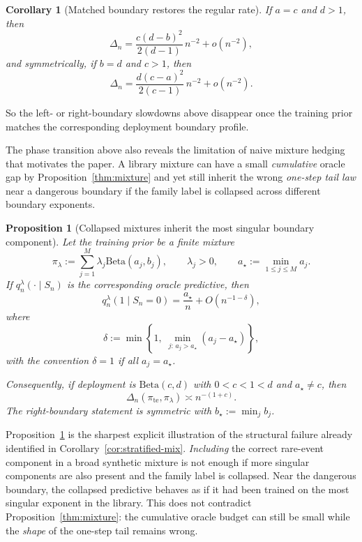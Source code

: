 \documentclass{article}
\newtheorem{proposition}[theorem]{Proposition}
\newtheorem{corollary}[theorem]{Corollary}
\theoremstyle{definition}
\theoremstyle{remark}
\newcommand{\BetaDist}{\mathrm{Beta}}
\newcommand{\te}{\mathrm{te}}
\begin{document}
\begin{corollary}[Matched boundary restores the regular rate]
\label{cor:beta-matched}
If $a=c$ and $d>1$, then
\[
\Delta_n
=
\frac{c(d-b)^2}{2(d-1)}\,n^{-2}
+ o(n^{-2}),
\]
and symmetrically, if $b=d$ and $c>1$, then
\[
\Delta_n
=
\frac{d(c-a)^2}{2(c-1)}\,n^{-2}
+ o(n^{-2}).
\]
\end{corollary}

So the left- or right-boundary slowdowns above disappear once the training prior matches the corresponding deployment boundary profile.

The phase transition above also reveals the limitation of naive mixture hedging that motivates the paper. A library mixture can have a small \emph{cumulative} oracle gap by Proposition~\ref{thm:mixture} and yet still inherit the wrong \emph{one-step tail law} near a dangerous boundary if the family label is collapsed across different boundary exponents.

\begin{proposition}[Collapsed mixtures inherit the most singular boundary component]
\label{thm:beta-mix}
Let the training prior be a finite mixture
\[
\pi_\lambda
:=
\sum_{j=1}^M \lambda_j \BetaDist(a_j,b_j),
\qquad
\lambda_j>0,
\qquad
a_\star:=\min_{1\le j\le M} a_j.
\]
If $q_n^\lambda(\cdot\mid S_n)$ is the corresponding oracle predictive, then
\[
q_n^\lambda(1\mid S_n=0)
=
\frac{a_\star}{n}
+ O(n^{-1-\delta}),
\]
where
\[
\delta
:=
\min\!\left\{
1,\;
\min_{j:\,a_j>a_\star}(a_j-a_\star)
\right\},
\]
with the convention $\delta=1$ if all $a_j=a_\star$.

Consequently, if deployment is $\BetaDist(c,d)$ with $0<c<1<d$ and $a_\star\neq c$, then
\[
\Delta_n(\pi_{\te},\pi_\lambda)\asymp n^{-(1+c)}.
\]
The right-boundary statement is symmetric with $b_\star:=\min_j b_j$.
\end{proposition}

Proposition~\ref{thm:beta-mix} is the sharpest explicit illustration of the structural failure already identified in Corollary~\ref{cor:stratified-mix}. \emph{Including} the correct rare-event component in a broad synthetic mixture is not enough if more singular components are also present and the family label is collapsed. Near the dangerous boundary, the collapsed predictive behaves as if it had been trained on the most singular exponent in the library. This does not contradict Proposition~\ref{thm:mixture}: the cumulative oracle budget can still be small while the \emph{shape} of the one-step tail remains wrong.
\end{document}
